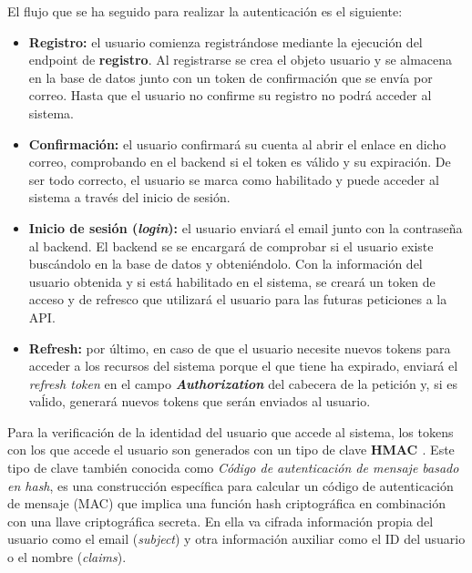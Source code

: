 El flujo que se ha seguido para realizar la autenticación es el siguiente:

\begin{itemize}
    \item \textbf{Registro:} el usuario comienza registrándose mediante la ejecución del endpoint de \textbf{registro}. Al registrarse se crea 
    el objeto usuario y se almacena en la base de datos junto con un token de confirmación que se envía por correo. Hasta que el usuario no 
    confirme su registro no podrá acceder al sistema.

    \item \textbf{Confirmación:} el usuario confirmará su cuenta al abrir el enlace en dicho correo, comprobando en el backend si el token es
    válido y su expiración. De ser todo correcto, el usuario se marca como habilitado y puede acceder al sistema a través del inicio de sesión.

    \item \textbf{Inicio de sesión (\textit{login}):} el usuario enviará el email junto con la contraseña al backend. El backend se 
    se encargará de comprobar si el usuario existe buscándolo en la base de datos y obteniéndolo. Con la información del usuario obtenida y si
    está habilitado en el sistema, se creará un token de acceso y de refresco que utilizará el usuario para las futuras peticiones a la API.

    \item \textbf{Refresh:} por último, en caso de que el usuario necesite nuevos tokens para acceder a los recursos del sistema porque el que
    tiene ha expirado, enviará el \textit{refresh token} en el campo \textbf{\textit{Authorization}} del cabecera de la petición y, si es vaĺido,
    generará nuevos tokens que serán enviados al usuario.
\end{itemize} 

Para la verificación de la identidad del usuario que accede al sistema, los tokens con los que accede el usuario son generados con un tipo de clave
\textbf{HMAC \cite{hmac}}. Este tipo de clave también conocida como \textit{Código de autenticación de mensaje basado en hash}, es una construcción específica 
para calcular un código de autenticación de mensaje (MAC) que implica una función hash criptográfica en combinación con una llave criptográfica secreta.
En ella va cifrada información propia del usuario como el email (\textit{subject}) y otra información auxiliar
como el ID del usuario o el nombre (\textit{claims}). 

